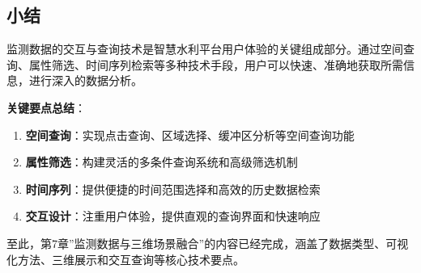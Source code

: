 \subsection{小结}\label{ux5c0fux7ed3}

监测数据的交互与查询技术是智慧水利平台用户体验的关键组成部分。通过空间查询、属性筛选、时间序列检索等多种技术手段，用户可以快速、准确地获取所需信息，进行深入的数据分析。

\textbf{关键要点总结}：

\begin{enumerate}
\def\labelenumi{\arabic{enumi}.}
\item
  \textbf{空间查询}：实现点击查询、区域选择、缓冲区分析等空间查询功能
\item
  \textbf{属性筛选}：构建灵活的多条件查询系统和高级筛选机制
\item
  \textbf{时间序列}：提供便捷的时间范围选择和高效的历史数据检索
\item
  \textbf{交互设计}：注重用户体验，提供直观的查询界面和快速响应
\end{enumerate}

至此，第7章''监测数据与三维场景融合''的内容已经完成，涵盖了数据类型、可视化方法、三维展示和交互查询等核心技术要点。

